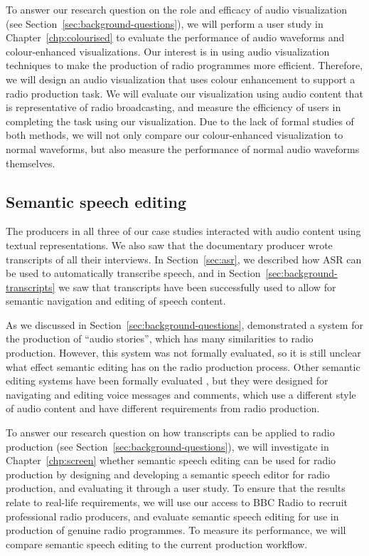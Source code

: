 To answer our research question on the role and efficacy of audio visualization (see
Section~\ref{sec:background-questions}), we will perform a user study in Chapter~\ref{chp:colourised} to evaluate the
performance of audio waveforms and colour-enhanced visualizations. Our interest is in using audio visualization
techniques to make the production of radio programmes more efficient.  Therefore, we will design an audio visualization
that uses colour enhancement to support a radio production task.  We will evaluate our visualization using audio
content that is representative of radio broadcasting, and measure the efficiency of users in completing the task using
our visualization. Due to the lack of formal studies of both methods, we will not only compare our colour-enhanced
visualization to normal waveforms, but also measure the performance of normal audio waveforms themselves.

\subsection{Semantic speech editing}

The producers in all three of our case studies interacted with audio content using textual representations. We also saw
that the documentary producer wrote transcripts of all their interviews.  In Section~\ref{sec:asr}, we described how
ASR can be used to automatically transcribe speech, and in Section~\ref{sec:background-transcripts} we saw that
transcripts have been successfully used to allow for semantic navigation and editing of speech content.

As we discussed in Section~\ref{sec:background-questions}, \citet{Rubin2013} demonstrated a system for the production
of ``audio stories'', which has many similarities to radio production.  However, this system was not formally
evaluated, so it is still unclear what effect semantic editing has on the radio production process. Other semantic
editing systems have been formally evaluated \citep{Whittaker2004,Yoon2014,Sivaraman2016}, but they were designed for
navigating and editing voice messages and comments, which use a different style of audio content and have different
requirements from radio production.

To answer our research question on how transcripts can be applied to radio production (see
Section~\ref{sec:background-questions}), we will investigate in Chapter~\ref{chp:screen} whether semantic speech
editing can be used for radio production by designing and developing a semantic speech editor for radio production, and
evaluating it through a user study.  To ensure that the results relate to real-life requirements, we will use our
access to BBC Radio to recruit professional radio producers, and evaluate semantic speech editing for use in production
of genuine radio programmes.  To measure its performance, we will compare semantic speech editing to the current
production workflow.

